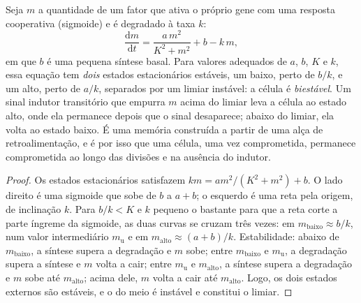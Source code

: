\begin{theorem}\label{thm:b2:cell-differentiation:switch}
Seja $m$ a quantidade de um fator que ativa o próprio gene com uma
resposta cooperativa (sigmoide) e é degradado à taxa $k$:
\[
\frac{\mathrm{d}m}{\mathrm{d}t} = \frac{a\,m^{2}}{K^{2} + m^{2}} + b - k\,m,
\]
em que $b$ é uma pequena síntese basal. Para valores adequados de $a$,
$b$, $K$ e $k$, essa equação tem \emph{dois} estados estacionários
estáveis, um baixo, perto de $b/k$, e um alto, perto de $a/k$,
separados por um limiar instável: a célula é \emph{biestável}. Um sinal
indutor transitório que empurra $m$ acima do limiar leva a célula ao
estado alto, onde ela permanece depois que o sinal desaparece; abaixo
do limiar, ela volta ao estado baixo. É uma memória construída a
partir de uma alça de retroalimentação, e é por isso que uma célula,
uma vez comprometida, permanece comprometida ao longo das divisões e na
ausência do indutor.
\end{theorem}
\begin{proof}
Os estados estacionários satisfazem $k m = a m^{2}/(K^{2} + m^{2}) + b$.
O lado direito é uma sigmoide que sobe de $b$ a $a + b$; o esquerdo é
uma reta pela origem, de inclinação $k$. Para $b/k < K$ e $k$ pequeno o
bastante para que a reta corte a parte íngreme da sigmoide, as duas
curvas se cruzam três vezes: em $m_{\text{baixo}} \approx b/k$, num
valor intermediário $m_{\text{u}}$ e em $m_{\text{alto}} \approx (a +
b)/k$. Estabilidade: abaixo de $m_{\text{baixo}}$, a síntese supera a
degradação e $m$ sobe; entre $m_{\text{baixo}}$ e $m_{\text{u}}$, a
degradação supera a síntese e $m$ volta a cair; entre $m_{\text{u}}$ e
$m_{\text{alto}}$, a síntese supera a degradação e $m$ sobe até
$m_{\text{alto}}$; acima dele, $m$ volta a cair até $m_{\text{alto}}$.
Logo, os dois estados externos são estáveis, e o do meio é instável e
constitui o limiar.
\end{proof}

